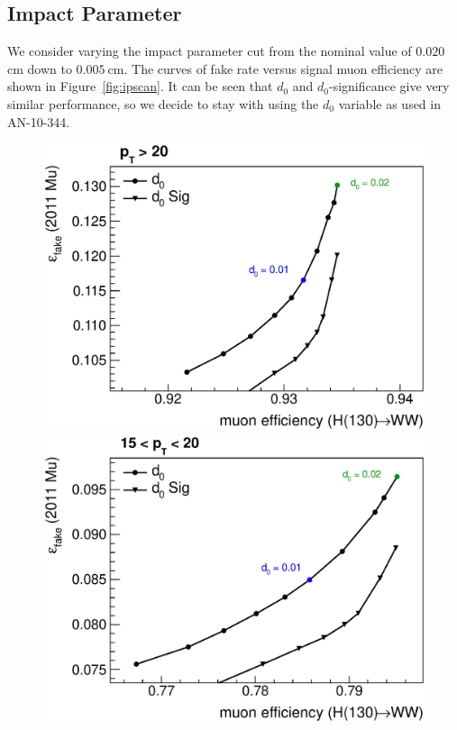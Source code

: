 \subsection{Impact Parameter}
We consider varying the impact parameter cut from the nominal value of $0.020\:$cm down to $0.005\:$cm. The curves of fake rate versus signal muon efficiency are shown in Figure~\ref{fig:ipscan}. It can be seen that $d_0$ and $d_0$-significance give very similar performance, so we decide to stay with using the $d_0$ variable as used in AN-10-344.

\begin{figure}[!htbp]
\begin{center}
\includegraphics[scale=0.4]{figures/ipscan0.eps}
\includegraphics[scale=0.4]{figures/ipscan1.eps}

\end{center}
\end{figure}

